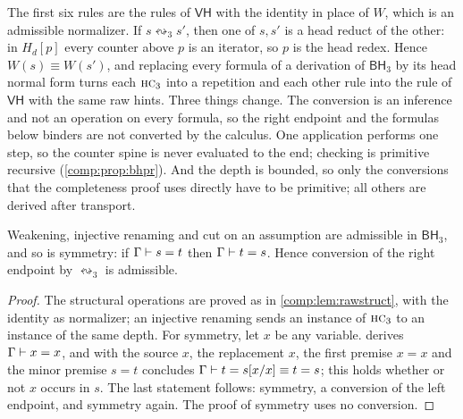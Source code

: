 The first six rules are the rules of $\mathsf{VH}$ with the identity in place
of $W$, which is an admissible normalizer. If $s\leftrightsquigarrow_3s'$,
then one of $s,s'$ is a head reduct of the other: in $H_d[p]$ every counter
above $p$ is an iterator, so $p$ is the head redex. Hence
$W(s)\equiv W(s')$, and replacing every formula of a derivation of
$\mathsf{BH}_3$ by its head normal form turns each $\rulename{HC}_3$ into a
repetition and each other rule into the rule of $\mathsf{VH}$ with the same
raw hints. Three things change. The conversion is an inference and not an
operation on every formula, so the right endpoint and the formulas below
binders are not converted by the calculus. One application performs one
step, so the counter spine is never evaluated to the end; checking is
primitive recursive (\cref{comp:prop:bhpr}). And the depth is bounded, so
only the conversions that the completeness proof uses directly have to be
primitive; all others are derived after transport.

\begin{lemma}
\label{comp:lem:bhsym}
Weakening, injective renaming and cut on an assumption are admissible in
$\mathsf{BH}_3$, and so is symmetry: if $\Gamma\vdash s=t$ then
$\Gamma\vdash t=s$. Hence conversion of the right endpoint by
$\leftrightsquigarrow_3$ is admissible.
\end{lemma}

\begin{proof}
The structural operations are proved as in \cref{comp:lem:rawstruct}, with
the identity as normalizer; an injective renaming sends an instance of
$\rulename{HC}_3$ to an instance of the same depth. For symmetry, let $x$ be
any variable.  derives $\Gamma\vdash x=x$, and
 with the source $x$, the replacement $x$, the first premise
$x=x$ and the minor premise $s=t$ concludes
$\Gamma\vdash t=s[x/x]\equiv t=s$; this holds whether or not $x$
occurs in $s$. The last statement follows: symmetry, a conversion of the
left endpoint, and symmetry again. The proof of symmetry uses no conversion.
\end{proof}

